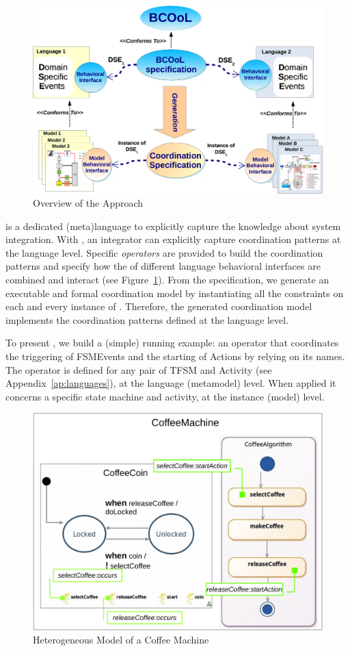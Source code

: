 \begin{figure}
	\center
	\includegraphics[width=1\columnwidth]{bcool/figs/bcoolpic.pdf}
	\caption{Overview of the Approach}
	\label{fig:bcoolpic}
\end{figure}

\bcool is a dedicated (meta)language to explicitly capture the knowledge about system integration. With \bcool, an integrator can explicitly capture coordination patterns at the language level. Specific \emph{operators} are provided to build the coordination patterns and specify how the \dse of different language behavioral interfaces are combined and interact (see Figure~\ref{fig:bcoolpic}). From the \bcool specification, we generate an executable and formal coordination model by instantiating all the constraints on each and every instance of \dse. Therefore, the generated coordination model implements the coordination patterns defined at the language level.  

To present \bcool, we build a (simple) running example: an operator that coordinates the triggering of FSMEvents and the starting of Actions by relying on its names. The operator is defined for any pair of TFSM and Activity (see Appendix~\ref{ap:languages}), at the language (metamodel) level. When applied it concerns a specific state machine and activity, at the instance (model) level. 

\begin{figure}
	\center
	\includegraphics[width=.5\columnwidth]{bcool/figs/models.pdf}
	\caption{Heterogeneous Model of a Coffee Machine}
	\label{fig:runningexample}
\end{figure}

